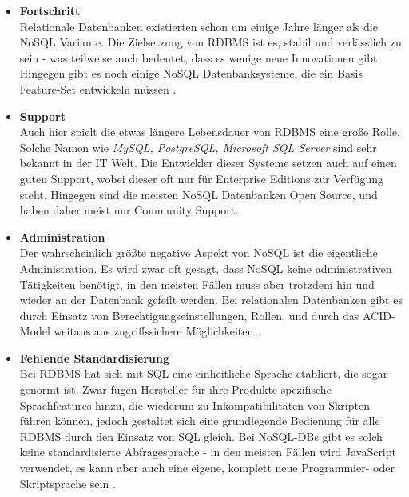 \begin{itemize}
	\item \textbf{Fortschritt\\}
	Relationale Datenbanken existierten schon um einige Jahre länger als die NoSQL Variante. Die Zielsetzung von RDBMS ist es, stabil und verlässlich zu sein - was teilweise auch bedeutet, dass es wenige neue Innovationen gibt. Hingegen gibt es noch einige NoSQL Datenbanksysteme, die ein Basis Feature-Set entwickeln müssen \cite{MELD.CH2-noSQL.maturity}\cite{MELD.CH2-noSQL.considerations}.

	\item \textbf{Support\\}
	Auch hier spielt die etwas längere Lebensdauer von RDBMS eine große Rolle. Solche Namen wie \textit{MySQL, PostgreSQL, Microsoft SQL Server} sind sehr bekannt in der IT Welt. Die Entwickler dieser Systeme setzen auch auf einen guten Support, wobei dieser oft nur für Enterprise Editions zur Verfügung steht. Hingegen sind die meisten NoSQL Datenbanken Open Source, und haben daher meist nur Community Support\cite{MELD.CH2-noSQL.considerations}.

	\item \textbf{Administration\\}
	Der wahrscheinlich größte negative Aspekt von NoSQL ist die eigentliche Administration. Es wird zwar oft gesagt, dass NoSQL keine administrativen Tätigkeiten benötigt, in den meisten Fällen muss aber trotzdem hin und wieder an der Datenbank gefeilt werden. Bei relationalen Datenbanken gibt es durch Einsatz von Berechtigungseinstellungen, Rollen, und durch das ACID-Model weitaus aus zugriffssichere Möglichkeiten \cite{MELD.CH2-noSQL.administration}.

	\item \textbf{Fehlende Standardisierung\\}
	Bei RDBMS hat sich mit SQL eine einheitliche Sprache etabliert, die sogar genormt ist. Zwar fügen Hersteller für ihre Produkte spezifische Sprachfeatures hinzu, die wiederum zu Inkompatibilitäten von Skripten führen können, jedoch gestaltet sich eine grundlegende Bedienung für alle RDBMS durch den Einsatz von SQL gleich. Bei NoSQL-DBs gibt es solch keine standardisierte Abfragesprache - in den meisten Fällen wird JavaScript verwendet, es kann aber auch eine eigene, komplett neue Programmier- oder Skriptsprache sein \cite{MELD.CH2-noSQL.maturity}\cite{MELD.CH2-noSQL.considerations}.
\end{itemize}

\clearpage
